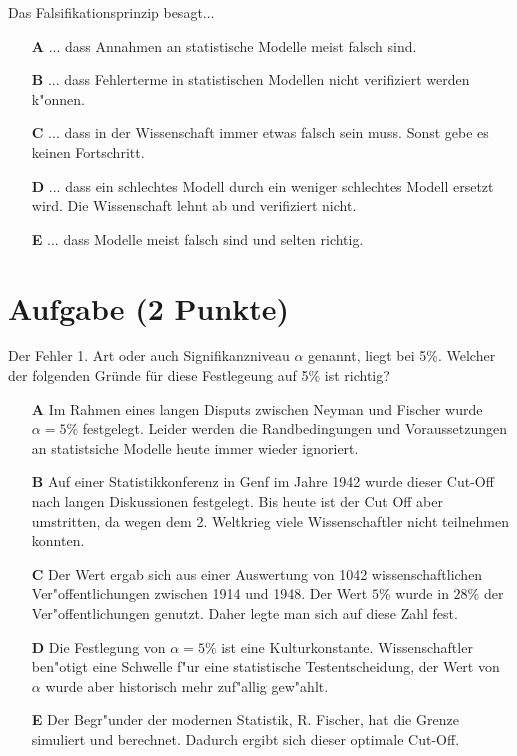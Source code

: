 \documentclass[a4paper, 10pt]{scrartcl}\usepackage[]{graphicx}\usepackage[]{xcolor}
\begin{document}
Das Falsifikationsprinzip besagt... 



\begin{enumerate}
\item [\textbf{A} \msquare] ... dass Annahmen an statistische Modelle meist falsch sind.
\item [\textbf{B} \msquare] ... dass Fehlerterme in statistischen Modellen nicht verifiziert werden k{"o}nnen.
\item [\textbf{C} \msquare] ... dass in der Wissenschaft immer etwas falsch sein muss. Sonst gebe es keinen Fortschritt.
\item [\textbf{D} \msquare] ... dass ein schlechtes Modell durch ein weniger schlechtes Modell ersetzt wird. Die Wissenschaft lehnt ab und verifiziert nicht.
\item [\textbf{E} \msquare] ... dass Modelle meist falsch sind und selten richtig.
\end{enumerate}

\section{Aufgabe \hfill (2 Punkte)}

Der Fehler 1. Art oder auch Signifikanzniveau $\alpha$ genannt, liegt bei
5\%. Welcher der folgenden Gr{\"u}nde f{\"u}r diese Festlegeung auf 5\% ist richtig?



\begin{enumerate}
\item [\textbf{A} \msquare] Im Rahmen eines langen Disputs zwischen Neyman und Fischer wurde $\alpha = 5\%$ festgelegt. Leider werden die Randbedingungen und Voraussetzungen an statistsiche Modelle heute immer wieder ignoriert.
\item [\textbf{B} \msquare] Auf einer Statistikkonferenz in Genf im Jahre 1942 wurde dieser Cut-Off nach langen Diskussionen festgelegt. Bis heute ist der Cut Off aber umstritten, da wegen dem 2. Weltkrieg viele Wissenschaftler nicht teilnehmen konnten.
\item [\textbf{C} \msquare] Der Wert ergab sich aus einer Auswertung von 1042 wissenschaftlichen Ver{"o}ffentlichungen zwischen 1914 und 1948. Der Wert $5\%$ wurde in $28\%$ der Ver{"o}ffentlichungen genutzt. Daher legte man sich auf diese Zahl fest.
\item [\textbf{D} \msquare] Die Festlegung von $\alpha = 5\%$ ist eine Kulturkonstante. Wissenschaftler ben{"o}tigt eine Schwelle f{"u}r eine statistische Testentscheidung, der Wert von $\alpha$ wurde aber historisch mehr zuf{"a}llig gew{"a}hlt.
\item [\textbf{E} \msquare] Der Begr{"u}nder der modernen Statistik, R. Fischer, hat die Grenze simuliert und berechnet. Dadurch ergibt sich dieser optimale Cut-Off.
\end{enumerate}
\end{document}

